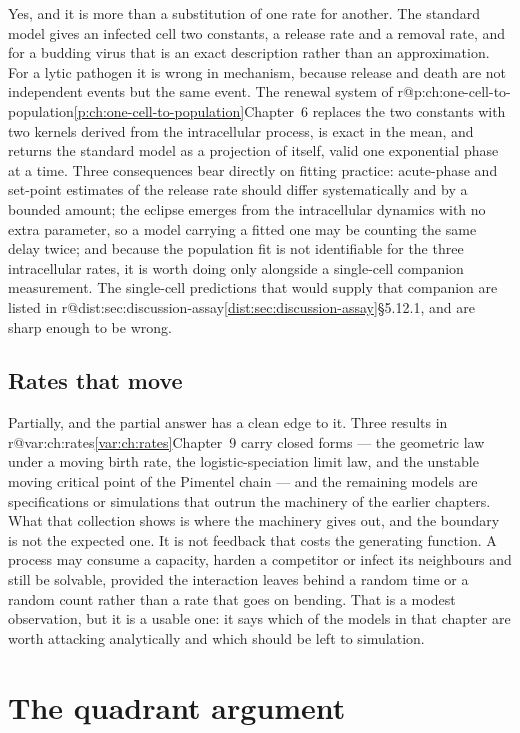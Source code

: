 \documentclass[11pt,a4paper]{report}
\makeatletter
\providecommand{\mextref}[2]{%
  \ifcsname r@#1\endcsname\cref{#1}\else#2\fi}
\theoremstyle{plain}
\theoremstyle{remark}
\makeatother
\begin{document}
Yes, and it is more than a substitution of one rate for another. The standard
model gives an infected cell two constants, a release rate and a removal
rate, and for a budding virus that is an exact description rather than an
approximation. For a lytic pathogen it is wrong in mechanism, because release
and death are not independent events but the same event. The renewal system
of \mextref{p:ch:one-cell-to-population}{Chapter~6} replaces the two
constants with two kernels derived from the intracellular process, is exact
in the mean, and returns the standard model as a projection of itself, valid
one exponential phase at a time. Three consequences bear directly on fitting
practice: acute-phase and set-point estimates of the release rate should
differ systematically and by a bounded amount; the eclipse emerges from the
intracellular dynamics with no extra parameter, so a model carrying a fitted
one may be counting the same delay twice; and because the population fit is
not identifiable for the three intracellular rates, it is worth doing only
alongside a single-cell companion measurement. The single-cell predictions
that would supply that companion are listed in
\mextref{dist:sec:discussion-assay}{\S5.12.1}, and are sharp enough to be
wrong.

\subsection{Rates that move}
\label{con:sec:q4}

Partially, and the partial answer has a clean edge to it. Three results in
\mextref{var:ch:rates}{Chapter~9} carry closed forms --- the geometric law
under a moving birth rate, the logistic-speciation limit law, and the
unstable moving critical point of the Pimentel chain --- and the remaining
models are specifications or simulations that outrun the machinery of the
earlier chapters. What that collection shows is where the machinery gives
out, and the boundary is not the expected one. It is not feedback that costs
the generating function. A process may consume a
capacity, harden a competitor or infect its neighbours and still be solvable,
provided the interaction leaves behind a random time or a random count rather
than a rate that goes on bending. That is a modest observation, but it is a
usable one: it says which of the models in that chapter are worth attacking
analytically and which should be left to simulation.

\section{The quadrant argument}
\label{con:sec:quadrant}
\end{document}

